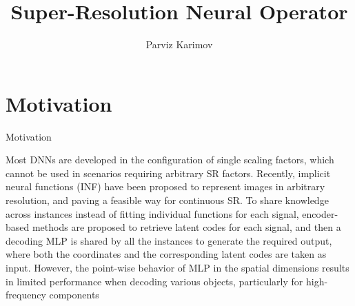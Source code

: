 \documentclass{beamer}
\title{Super-Resolution Neural Operator}
\author{Parviz Karimov}
\institute{MIPT, 2024}
\begin{document}
\begin{frame}
    \titlepage
\end{frame}


\begin{frame}
    \tableofcontents
\end{frame}


\section{Motivation}

\begin{frame}{Motivation}
    \begin{block}{}
     Most DNNs are developed in the configuration of single scaling factors, which cannot be used in scenarios requiring arbitrary SR factors. Recently, implicit neural functions (INF) have been proposed to represent images in arbitrary resolution, and paving a feasible way for continuous SR. To share knowledge across instances instead of fitting individual functions for each signal, encoder-based methods are proposed to retrieve latent codes for each signal, and then a decoding MLP is shared by all the instances to generate the required output, where both the coordinates and the corresponding latent codes are taken as input. However, the point-wise behavior of MLP in the spatial dimensions results in limited performance when decoding various objects, particularly for high-frequency components
    \end{block} 
\end{frame}
\end{document}
